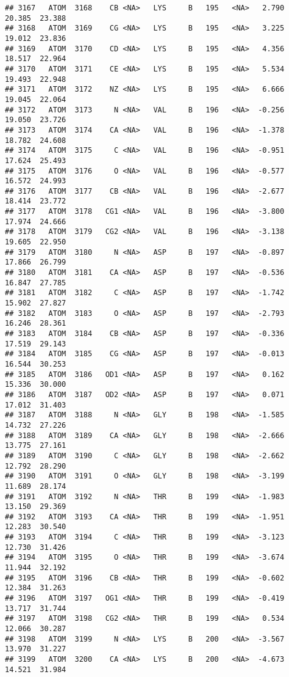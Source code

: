 \documentclass[
]{article}
\begin{document}
\begin{verbatim}
## 3167   ATOM  3168    CB <NA>   LYS     B   195   <NA>   2.790  20.385  23.388
## 3168   ATOM  3169    CG <NA>   LYS     B   195   <NA>   3.225  19.012  23.836
## 3169   ATOM  3170    CD <NA>   LYS     B   195   <NA>   4.356  18.517  22.964
## 3170   ATOM  3171    CE <NA>   LYS     B   195   <NA>   5.534  19.493  22.948
## 3171   ATOM  3172    NZ <NA>   LYS     B   195   <NA>   6.666  19.045  22.064
## 3172   ATOM  3173     N <NA>   VAL     B   196   <NA>  -0.256  19.050  23.726
## 3173   ATOM  3174    CA <NA>   VAL     B   196   <NA>  -1.378  18.782  24.608
## 3174   ATOM  3175     C <NA>   VAL     B   196   <NA>  -0.951  17.624  25.493
## 3175   ATOM  3176     O <NA>   VAL     B   196   <NA>  -0.577  16.572  24.993
## 3176   ATOM  3177    CB <NA>   VAL     B   196   <NA>  -2.677  18.414  23.772
## 3177   ATOM  3178   CG1 <NA>   VAL     B   196   <NA>  -3.800  17.974  24.666
## 3178   ATOM  3179   CG2 <NA>   VAL     B   196   <NA>  -3.138  19.605  22.950
## 3179   ATOM  3180     N <NA>   ASP     B   197   <NA>  -0.897  17.866  26.799
## 3180   ATOM  3181    CA <NA>   ASP     B   197   <NA>  -0.536  16.847  27.785
## 3181   ATOM  3182     C <NA>   ASP     B   197   <NA>  -1.742  15.902  27.827
## 3182   ATOM  3183     O <NA>   ASP     B   197   <NA>  -2.793  16.246  28.361
## 3183   ATOM  3184    CB <NA>   ASP     B   197   <NA>  -0.336  17.519  29.143
## 3184   ATOM  3185    CG <NA>   ASP     B   197   <NA>  -0.013  16.544  30.253
## 3185   ATOM  3186   OD1 <NA>   ASP     B   197   <NA>   0.162  15.336  30.000
## 3186   ATOM  3187   OD2 <NA>   ASP     B   197   <NA>   0.071  17.012  31.403
## 3187   ATOM  3188     N <NA>   GLY     B   198   <NA>  -1.585  14.732  27.226
## 3188   ATOM  3189    CA <NA>   GLY     B   198   <NA>  -2.666  13.775  27.161
## 3189   ATOM  3190     C <NA>   GLY     B   198   <NA>  -2.662  12.792  28.290
## 3190   ATOM  3191     O <NA>   GLY     B   198   <NA>  -3.199  11.689  28.174
## 3191   ATOM  3192     N <NA>   THR     B   199   <NA>  -1.983  13.150  29.369
## 3192   ATOM  3193    CA <NA>   THR     B   199   <NA>  -1.951  12.283  30.540
## 3193   ATOM  3194     C <NA>   THR     B   199   <NA>  -3.123  12.730  31.426
## 3194   ATOM  3195     O <NA>   THR     B   199   <NA>  -3.674  11.944  32.192
## 3195   ATOM  3196    CB <NA>   THR     B   199   <NA>  -0.602  12.384  31.263
## 3196   ATOM  3197   OG1 <NA>   THR     B   199   <NA>  -0.419  13.717  31.744
## 3197   ATOM  3198   CG2 <NA>   THR     B   199   <NA>   0.534  12.066  30.287
## 3198   ATOM  3199     N <NA>   LYS     B   200   <NA>  -3.567  13.970  31.227
## 3199   ATOM  3200    CA <NA>   LYS     B   200   <NA>  -4.673  14.521  31.984

\end{verbatim}
\end{document}
